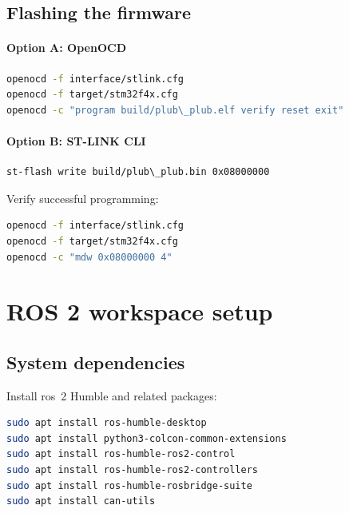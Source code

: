 \subsection{Flashing the firmware}
\paragraph*{Option A: OpenOCD}
\begin{lstlisting}[language=bash]
openocd -f interface/stlink.cfg
openocd -f target/stm32f4x.cfg
openocd -c "program build/plub\_plub.elf verify reset exit"
\end{lstlisting}

\paragraph*{Option B: ST-LINK CLI}
\begin{lstlisting}[language=bash]
st-flash write build/plub\_plub.bin 0x08000000
\end{lstlisting}

\noindent Verify successful programming:
\begin{lstlisting}[language=bash]
openocd -f interface/stlink.cfg
openocd -f target/stm32f4x.cfg
openocd -c "mdw 0x08000000 4"
\end{lstlisting}

\section{ROS 2 workspace setup}

\subsection{System dependencies}
Install \gls{ros}~2 Humble and related packages:
\begin{lstlisting}[language=bash]
sudo apt install ros-humble-desktop
sudo apt install python3-colcon-common-extensions
sudo apt install ros-humble-ros2-control
sudo apt install ros-humble-ros2-controllers
sudo apt install ros-humble-rosbridge-suite
sudo apt install can-utils
\end{lstlisting}

